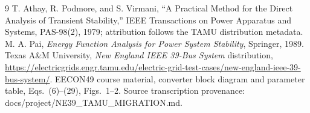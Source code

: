 \documentclass[12pt,a4paper]{article}
\newcommand{\code}[1]{{\ttfamily\small\hyphenchar\font=-1 #1}}
\begin{document}
\begin{thebibliography}{9}
 T. Athay, R. Podmore, and S. Virmani,
``A Practical Method for the Direct Analysis of Transient Stability,''
IEEE Transactions on Power Apparatus and Systems, PAS-98(2), 1979;
attribution follows the TAMU distribution metadata.
 M. A. Pai, \emph{Energy Function Analysis for Power System
Stability}, Springer, 1989.
 Texas A\&M University, \emph{New England IEEE 39-Bus System}
distribution, \url{https://electricgrids.engr.tamu.edu/electric-grid-test-cases/new-england-ieee-39-bus-system/}.
 EECON49 course material, converter block diagram and
parameter table, Eqs.~(6)--(29), Figs.~1--2.
 Source transcription provenance:
\code{docs/project/NE39\_TAMU\_MIGRATION.md}.
\end{thebibliography}
\end{document}
